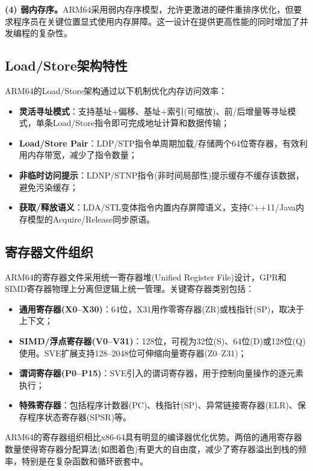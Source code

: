 \documentclass[12pt,a4paper]{IEEEtran}
\begin{document}
\textbf{(4) 弱内存序。}ARM64采用弱内存序模型，允许更激进的硬件重排序优化，但要求程序员在关键位置显式使用内存屏障。这一设计在提供更高性能的同时增加了并发编程的复杂性\cite{alarcon2023memorymodel}。

\subsection{Load/Store架构特性}

ARM64的Load/Store架构通过以下机制优化内存访问效率：

\begin{itemize}
\item \textbf{灵活寻址模式}：支持基址+偏移、基址+索引(可缩放)、前/后增量等寻址模式，单条Load/Store指令即可完成地址计算和数据传输；
\item \textbf{Load/Store Pair}：LDP/STP指令单周期加载/存储两个64位寄存器，有效利用内存带宽，减少了指令数量；
\item \textbf{非临时访问提示}：LDNP/STNP指令(非时间局部性)提示缓存不缓存该数据，避免污染缓存；
\item \textbf{获取/释放语义}：LDA/STL变体指令内置内存屏障语义，支持C++11/Java内存模型的Acquire/Release同步原语。
\end{itemize}

\subsection{寄存器文件组织}

ARM64的寄存器文件采用统一寄存器堆(Unified Register File)设计，GPR和SIMD寄存器物理上分离但逻辑上统一管理\cite{arm2022cortexx3}。关键寄存器类别包括：

\begin{itemize}
\item \textbf{通用寄存器(X0--X30)}：64位，X31用作零寄存器(ZR)或栈指针(SP)，取决于上下文；
\item \textbf{SIMD/浮点寄存器(V0--V31)}：128位，可视为32位(S)、64位(D)或128位(Q)使用。SVE扩展支持128--2048位可伸缩向量寄存器(Z0--Z31)；
\item \textbf{谓词寄存器(P0--P15)}：SVE引入的谓词寄存器，用于控制向量操作的逐元素执行；
\item \textbf{特殊寄存器}：包括程序计数器(PC)、栈指针(SP)、异常链接寄存器(ELR)、保存程序状态寄存器(SPSR)等。
\end{itemize}

ARM64的寄存器组织相比x86-64具有明显的编译器优化优势。两倍的通用寄存器数量使得寄存器分配算法(如图着色)有更大的自由度，减少了寄存器溢出到栈的频率，特别是在复杂函数和循环嵌套中。
\end{document}
